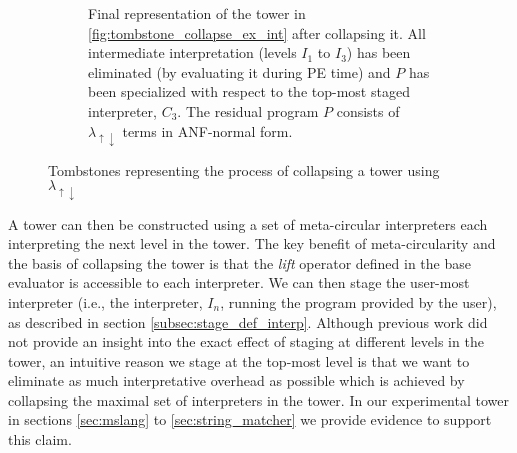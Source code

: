 \documentclass[a4paper,12pt,twoside,openright]{report}
\theoremstyle{definition}
\newcommand{\mslang}{$\lambda_{\uparrow\downarrow}$}
\begin{document}
\begin{figure}[ht!]
\begin{subfigure}{\linewidth}
    \caption{Final representation of the tower in \ref{fig:tombstone_collapse_ex_int} after collapsing it. All intermediate interpretation (levels $I_1$ to $I_3$) has been eliminated (by evaluating it during PE time) and $P$ has been specialized with respect to the top-most staged interpreter, $C_3$. The residual program $P$ consists of \mslang{} terms in ANF-normal form.}
    \label{fig:tombstone_collapsed}
    \end{subfigure}
    \caption{Tombstones representing the process of collapsing a tower using \mslang{}}
\end{figure}

A tower can then be constructed using a set of meta-circular interpreters each interpreting the next level in the tower. The key benefit of meta-circularity and the basis of collapsing the tower is that the \textit{lift} operator defined in the base evaluator is accessible to each interpreter. We can then stage the user-most interpreter (i.e., the interpreter, $I_n$, running the program provided by the user), as described in section \ref{subsec:stage_def_interp}. Although previous work did not provide an insight into the exact effect of staging at different levels in the tower, an intuitive reason we stage at the top-most level is that we want to eliminate as much interpretative overhead as possible which is achieved by collapsing the maximal set of interpreters in the tower. In our experimental tower in sections \ref{sec:mslang} to \ref{sec:string_matcher} we provide evidence to support this claim.
\end{document}
